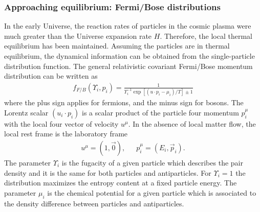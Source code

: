 \subsubsection{Approaching equilibrium: Fermi/Bose distributions}
In the early Universe, the reaction rates of particles in the cosmic plasma were much greater than the Universe expansion rate $H$. Therefore, the local thermal equilibrium has been maintained. Assuming the particles are in thermal equilibrium, the dynamical information can be obtained from the single-particle distribution function. The general relativistic covariant Fermi/Bose momentum distribution can be written as
\begin{align}
f_{F/B}(\Upsilon_i,p_i)=\frac{1}{\Upsilon^{-1}_i\exp{\left[(u\cdot p_i-\mu_i)/T\right]}\pm1}
\end{align}
where the plus sign applies for fermions, and the minus sign for bosons. The Lorentz scalar $(u_i\cdot p_i)$ is a scalar product of the particle four momentum $p^\mu_i$ with the local four vector of velocity $u^\mu$. In the absence of local matter flow, the local rest frame is the laboratory frame 
\begin{align}
u^\mu=\left(1,\vec{0}\right),\,\,\,\,\,\,\,\,\, p^\mu_i=\left(E_i,\vec{p}_i\right).
\end{align}  
The parameter $\Upsilon_i$ is the fugacity of a given particle which describes the pair density and it is the same for both particles and antiparticles. For $\Upsilon_i=1$ the distribution maximizes the entropy content at a fixed particle energy. The parameter $\mu_i$ is the chemical potential for a given particle which is associated to the density difference between particles and antiparticles. 

